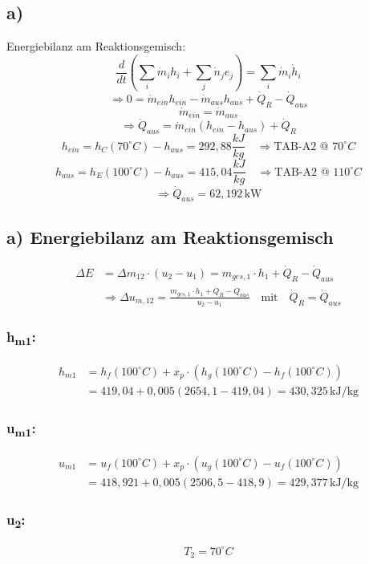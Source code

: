 

\subsection*{a)}
Energiebilanz am Reaktionsgemisch:
\[
\frac{d}{dt} \left( \sum_i \dot{m}_i h_i + \sum_j \dot{n}_j e_j \right) = \sum_i \dot{m}_i \dot{h}_i
\]
\[
\Rightarrow 0 = \dot{m}_{ein} h_{ein} - \dot{m}_{aus} h_{aus} + \dot{Q}_R - \dot{Q}_{aus}
\]
\[
\dot{m}_{ein} = \dot{m}_{aus}
\]
\[
\Rightarrow \dot{Q}_{aus} = \dot{m}_{ein} (h_{ein} - h_{aus}) + \dot{Q}_R
\]
\[
h_{ein} = h_C (70^\circ C) - h_{aus} = 292,88 \frac{kJ}{kg} \quad \Rightarrow \text{TAB-A2 @ 70}^\circ C
\]
\[
h_{aus} = h_E (100^\circ C) - h_{aus} = 415,04 \frac{kJ}{kg} \quad \Rightarrow \text{TAB-A2 @ 110}^\circ C
\]
\[
\Rightarrow \dot{Q}_{aus} = 62,192 \, \text{kW}
\]

\subsection*{a) Energiebilanz am Reaktionsgemisch}

\begin{align*}
\Delta E &= \Delta m_{12} \cdot (u_2 - u_1) = m_{ges,1} \cdot h_1 + \dot{Q}_R - \dot{Q}_{aus} \\
&\Rightarrow \Delta u_{m,12} = \frac{m_{ges,1} \cdot h_1 + \dot{Q}_R - \dot{Q}_{aus}}{u_2 - u_1} \quad \text{mit} \quad \dot{Q}_R = \dot{Q}_{aus}
\end{align*}

\subsubsection*{h\textsubscript{m1}:}
\begin{align*}
h_{m1} &= h_{f}(100^\circ C) + x_p \cdot \left( h_{g}(100^\circ C) - h_{f}(100^\circ C) \right) \\
&= 419,04 + 0,005 \left( 2654,1 - 419,04 \right) = 430,325 \, \text{kJ/kg}
\end{align*}

\subsubsection*{u\textsubscript{m1}:}
\begin{align*}
u_{m1} &= u_{f}(100^\circ C) + x_p \cdot \left( u_{g}(100^\circ C) - u_{f}(100^\circ C) \right) \\
&= 418,921 + 0,005 \left( 2506,5 - 418,9 \right) = 429,377 \, \text{kJ/kg}
\end{align*}

\subsubsection*{u\textsubscript{2}:}
\begin{align*}
T_2 = 70^\circ C
\end{align*}